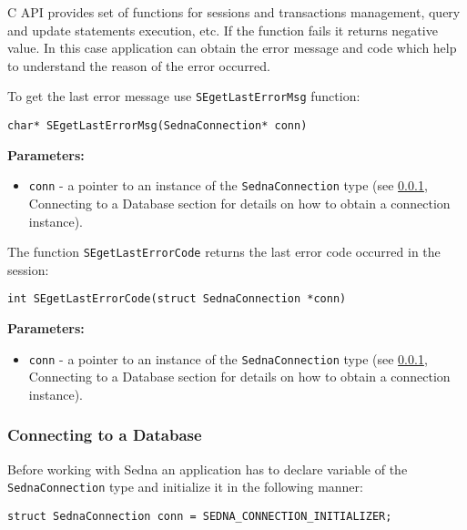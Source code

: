 \documentclass[a4paper,12pt]{article}
\newenvironment{citemize}
{\begin{itemize}
  \setlength{\itemsep}{0pt}
  \setlength{\parskip}{0pt}
  \setlength{\parsep}{0pt}}
{\end{itemize}}
\begin{document}
C API provides set of functions for sessions and transactions management, query
and update statements execution, etc. If the function fails it returns negative
value. In this case application can obtain the error message and code which help
to understand the reason of the error occurred.

To get the last error message use \verb!SEgetLastErrorMsg! function:

\begin{verbatim}
char* SEgetLastErrorMsg(SednaConnection* conn)
\end{verbatim}

\noindent
\textbf{Parameters:}

\begin{citemize}
\item\verb!conn! - a pointer to an instance of the \verb!SednaConnection! type
(see \ref{c-api-connecting}, Connecting to a Database section for details on
how to obtain a connection instance).
\end{citemize}

The function \verb!SEgetLastErrorCode! returns the last error code occurred in
the session:

\begin{verbatim}
int SEgetLastErrorCode(struct SednaConnection *conn)
\end{verbatim}

\noindent
\textbf{Parameters:}

\begin{citemize}
\item\verb!conn! - a pointer to an instance of the \verb!SednaConnection! type
(see \ref{c-api-connecting}, Connecting to a Database section for details on
how to obtain a connection instance).
\end{citemize}


\subsubsection{Connecting to a Database}
\label{c-api-connecting}

Before working with Sedna an application has to declare variable of the
\verb!SednaConnection! type and initialize it in the following manner:

\begin{verbatim}
struct SednaConnection conn = SEDNA_CONNECTION_INITIALIZER;
\end{verbatim}
\end{document}

